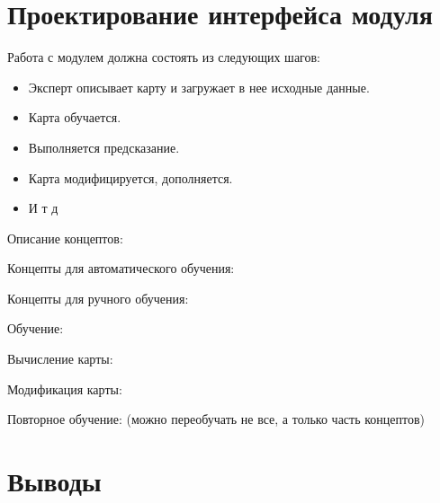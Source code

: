 
\section{Проектирование интерфейса модуля}

Работа с модулем должна состоять из следующих шагов:
\begin{itemize}
	\item Эксперт описывает карту и загружает в нее исходные данные.
	\item Карта обучается.
	\item Выполняется предсказание.
	\item Карта модифицируется, дополняется.
	\item И т д
\end{itemize}

Описание концептов:

Концепты для автоматического обучения:

Концепты для ручного обучения:

Обучение:

Вычисление карты:

Модификация карты:

Повторное обучение:
(можно переобучать не все, а только часть концептов)


\section{Выводы}
